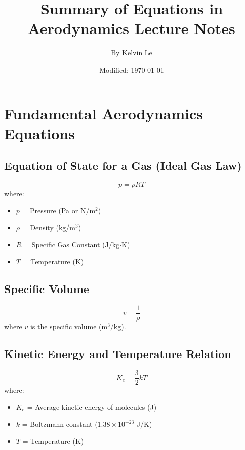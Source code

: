 \documentclass{article}
\begin{document}
 

\title{Summary of Equations in Aerodynamics Lecture Notes}
\author{By Kelvin Le}
\date{Modified: \today}
\maketitle

\tableofcontents

\section{Fundamental Aerodynamics Equations}

\subsection{Equation of State for a Gas (Ideal Gas Law)}
\begin{equation}
    p = \rho R T
\end{equation}
where:
\begin{itemize}
    \item $p$ = Pressure (Pa or N/m$^2$)
    \item $\rho$ = Density (kg/m$^3$)
    \item $R$ = Specific Gas Constant (J/kg$\cdot$K)
    \item $T$ = Temperature (K)
\end{itemize}

\subsection{Specific Volume}
\begin{equation}
    v = \frac{1}{\rho}
\end{equation}
where $v$ is the specific volume (m$^3$/kg).

\subsection{Kinetic Energy and Temperature Relation}
\begin{equation}
    K_e = \frac{3}{2} k T
\end{equation}
where:
\begin{itemize}
    \item $K_e$ = Average kinetic energy of molecules (J)
    \item $k$ = Boltzmann constant ($1.38 \times 10^{-23}$ J/K)
    \item $T$ = Temperature (K)
\end{itemize}
\end{document}
